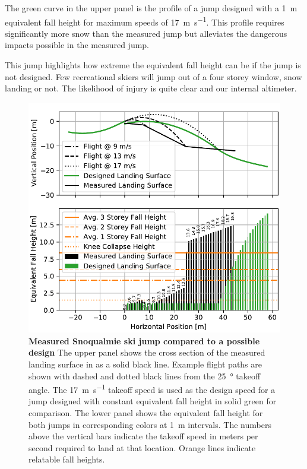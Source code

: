 \documentclass{article}
\begin{document}
The green curve in the upper panel is the profile of a jump designed with a
1~\si{\meter} equivalent fall height for maximum speeds of
17~\si{\meter\per\second}. This profile requires significantly more snow than
the measured jump but alleviates the dangerous impacts possible in the measured
jump.

This jump highlights how extreme the equivalent fall height can be if the jump
is not designed. Few recreational skiers will jump out of a four storey window,
snow landing or not. The likelihood of injury is quite clear and our internal
altimeter.
%
\begin{figure}
  \centering
  \includegraphics[width=5.25in]{figures/salvini-v-snoqualmie.pdf}
  \caption{\textbf{Measured Snoqualmie ski jump compared to a possible design}
  The upper panel shows the cross section of the measured landing surface in as
  a solid black line. Example flight paths are shown with dashed and dotted
  black lines from the 25~\si{\degree} takeoff angle. The
  17~\si{\meter\per\second} takeoff speed is used as the design speed for a
  jump designed with constant equivalent fall height in solid green for
  comparison. The lower panel shows the equivalent fall height for both jumps
  in corresponding colors at 1~\si{\meter} intervals. The numbers above the
  vertical bars indicate the takeoff speed in meters per second required to
  land at that location. Orange lines indicate relatable fall heights.}
  \label{fig:salvini-v-snoqualmie}
\end{figure}
\end{document}
